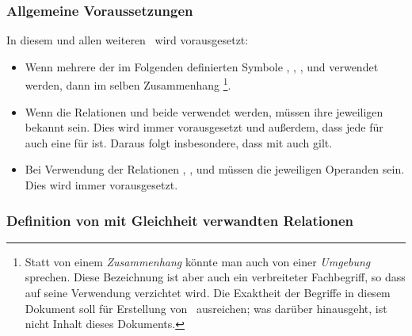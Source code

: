 \subsubsection{Allgemeine Voraussetzungen}
\label{subsub:Voraussetzungen}

In diesem und allen weiteren \sectionnames\ wird vorausgesetzt:
\begin{itemize}
	\item Wenn mehrere der im Folgenden definierten Symbole \symqt{\metadefeq}, , \symqt{=}, \symqt{\ne} und \symqt{\equiv} verwendet werden, dann im selben Zusammenhang%
	\footnote{%
		Statt von einem \emph{Zusammenhang} könnte man auch von einer \emph{Umgebung} sprechen.
		Diese Bezeichnung ist aber auch ein verbreiteter Fachbegriff, so dass auf seine Verwendung verzichtet wird.
		Die Exaktheit der Begriffe in diesem Dokument soll für Erstellung von \ASBA\ ausreichen; was darüber hinausgeht, ist nicht Inhalt dieses Dokuments.%
	}.
	\item Wenn die Relationen \opqt{=} und \opqt{\equiv} beide verwendet werden, müssen ihre jeweiligen \emph{} bekannt sein.
	Dies wird immer vorausgesetzt und außerdem, dass jede  für \opqt{\equiv} auch eine für \opqt{=} ist.
	Daraus folgt insbesondere, dass mit  auch  gilt.
	\item Bei Verwendung der Relationen \opqt{=}, \opqt{\ne}, \opqt{\equiv} und \opqt{\nequiv} müssen die jeweiligen Operanden  sein. Dies wird immer vorausgesetzt.
\end{itemize}

\subsubsection{Definition von mit Gleichheit verwandten Relationen}%
\label{subsub:DefinitionGleichheit}

